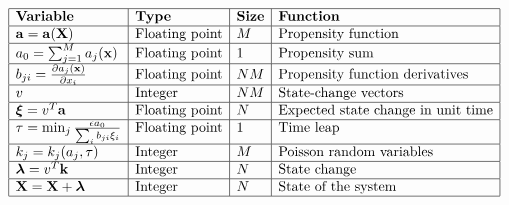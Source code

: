 \documentclass[letterpaper]{article}
\begin{document}
\begin{table}[h]
\[
\begin{array}{|l|l|l|l|}
\hline %
\text{\bf{Variable}} & \text{\bf{Type}} & \text{\bf{Size}} & \text{\bf{Function}} \\
\hline %
\mathbf{a} = \mathbf{a}(\mathbf{X}) & 
\text{Floating point} &
M &
\text{Propensity function} \\
\hline %
a_0 = \sum_{j=1}^M a_j(\mathbf{x}) & 
\text{Floating point} &
1 &
\text{Propensity sum} \\
\hline %
b_{ji} = \frac{\partial a_j(\mathbf{x})}{\partial x_i} &
\text{Floating point} &
N M &
\text{Propensity function derivatives} \\
\hline %
v &
\text{Integer} &
N M &
\text{State-change vectors} \\
\hline %
\boldsymbol{\xi} = v^{T} \mathbf{a} & 
\text{Floating point} &
N &
\text{Expected state change in unit time} \\
\hline %
\tau = \min_{j} \frac{\epsilon a_0}{\sum_i b_{ji} \xi_i} & 
\text{Floating point} &
1 &
\text{Time leap} \\
\hline %
k_j = k_j(a_j, \tau) & 
\text{Integer} &
M &
\text{Poisson random variables} \\
\hline %
\boldsymbol{\lambda} = v^T \mathbf{k} & 
\text{Integer} &
N &
\text{State change} \\
\hline %
\mathbf{X} = \mathbf{X} + \boldsymbol{\lambda} & 
\text{Integer} &
N &
\text{State of the system} \\
\hline %
\end{array}
\]
\caption{The variables in the basic $\tau$-leap method.}
\label{variablesInMethod}
\end{table}
\end{document}
